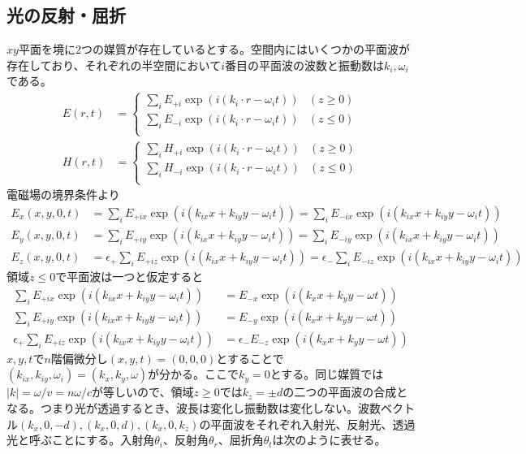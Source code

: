 \subsection{光の反射・屈折}
    $xy$平面を境に2つの媒質が存在しているとする。空間内にはいくつかの平面波が存在しており、それぞれの半空間において$i$番目の平面波の波数と振動数は$k_i, \omega_i$である。
    \begin{align*}
        E(r, t) &=
        \begin{cases}
            \sum_i E_{+i}\exp(i(k_i \cdot r - \omega_i t)) & (z \geq 0)\\
            \sum_i E_{-i}\exp(i(k_i \cdot r - \omega_i t)) & (z \leq 0)\\
        \end{cases}\\
        H(r, t) &=
        \begin{cases}
            \sum_i H_{+i}\exp(i(k_i \cdot r - \omega_i t)) & (z \geq 0)\\
            \sum_i H_{-i}\exp(i(k_i \cdot r - \omega_i t)) & (z \leq 0)\\
        \end{cases}
    \end{align*}
    電磁場の境界条件より
    \begin{align*}
        E_x(x, y, 0, t) &= \sum_i E_{+ix}\exp(i(k_{ix}x + k_{iy}y - \omega_i t)) = \sum_i E_{-ix}\exp(i(k_{ix}x + k_{iy}y - \omega_i t))\\
        E_y(x, y, 0, t) &= \sum_i E_{+iy}\exp(i(k_{ix}x + k_{iy}y - \omega_i t)) = \sum_i E_{-iy}\exp(i(k_{ix}x + k_{iy}y - \omega_i t))\\
        E_z(x, y, 0, t) &= \epsilon_+ \sum_i E_{+iz}\exp(i(k_{ix}x + k_{iy}y - \omega_i t)) = \epsilon_- \sum_i E_{-iz}\exp(i(k_{ix}x + k_{iy}y - \omega_i t))
    \end{align*}
    領域$z \leq 0$で平面波は一つと仮定すると
    \begin{align*}
        \sum_i E_{+ix}\exp(i(k_{ix}x + k_{iy}y - \omega_i t)) &= E_{-x}\exp(i(k_xx + k_yy - \omega t))\\
        \sum_i E_{+iy}\exp(i(k_{ix}x + k_{iy}y - \omega_i t)) &= E_{-y}\exp(i(k_xx + k_yy - \omega t))\\
        \epsilon_+\sum_i E_{+iz}\exp(i(k_{ix}x + k_{iy}y - \omega_i t)) &= \epsilon_-E_{-z}\exp(i(k_xx + k_yy - \omega t))
    \end{align*}
    $x, y, t$で$n$階偏微分し$(x, y, t) = (0, 0, 0)$とすることで$(k_{ix}, k_{iy}, \omega_i) = (k_x, k_y, \omega)$が分かる。ここで$k_y = 0$とする。同じ媒質では$|k| = \omega / v = n\omega / c$が等しいので、領域$z \geq 0$では$k_z = \pm d$の二つの平面波の合成となる。つまり光が透過するとき、波長は変化し振動数は変化しない。波数ベクトル$(k_x, 0, -d), (k_x, 0, d), (k_x, 0, k_z)$の平面波をそれぞれ入射光、反射光、透過光と呼ぶことにする。入射角$\theta_i$、反射角$\theta_r$、屈折角$\theta_t$は次のように表せる。
